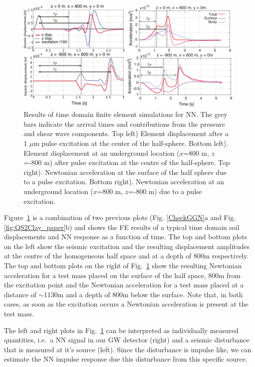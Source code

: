 \begin{figure}[h!]
	\begin{center}
		\includegraphics[width=16.5cm]{./Sec_SiteInfra/Figures/nngeneration.pdf}
		\caption{Results of time domain finite element simulations for NN. The grey bars indicate the arrival times and contributions from the pressure and shear wave components. Top left) Element displacement after a 1 $\mu$m pulse excitation at the center of the half-sphere. Bottom left). Element displacement at an underground location ($x$=800 m, $z$=-800 m) after pulse excitation at the centre of the half-sphere. Top right). Newtonian acceleration at the surface of the half sphere due to a pulse excitation. Bottom right). Newtonian acceleration at an underground location ($x$=800 m, $z$=-800 m) due to a pulse excitation.}
		\label{fig:NNfigure1}
	\end{center}
\end{figure}

Figure~\ref{fig:NNfigure1} is a combination of two previous plots (Fig. \ref{CheckGGN}a and Fig. \ref{fig:QS2Clay_paper}b) and shows the FE results of a typical time domain soil displacements and NN response as a function of time. The top and bottom plots on the left show the seismic excitation and the resulting displacement amplitudes at the centre of the homogeneous half space and at a depth of 800m respectively. The top and bottom plots on the right of Fig.~\ref{fig:NNfigure1} show the resulting Newtonian acceleration for a test mass placed on the surface of the half space, 800m from the excitation point and the Newtonian acceleration for a test mass placed at a distance of $\sim$1130m and a depth of 800m below the surface. Note that, in both cases, as soon as the excitation occurs a Newtonian acceleration is present at the test mass. 

The left and right plots in Fig.~\ref{fig:NNfigure1} can be interpreted as individually measured quantities, i.e.\ a NN signal in our GW detector (right) and a seismic disturbance that is measured at it's source (left). Since the disturbance is impulse like, we can estimate the NN impulse response due this disturbance from this specific source. 

